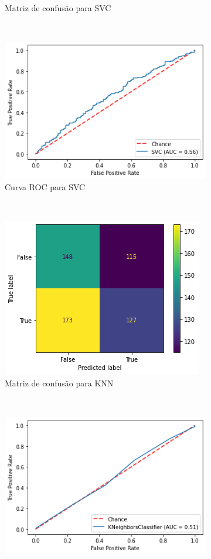 \begin{figure}[htb]
\begin{subfigure}[b]{0.45\textwidth}
        \caption{Matriz de confusão para SVC}
        \label{fig:resultados:base-de-dados-28.3.3-confusion-matrix-svc-total-cnae}
    \end{subfigure} ~ \quad
    \begin{subfigure}[b]{0.45\textwidth}
        \includegraphics[scale=0.45]{images/base-de-dados-28.4.4-roc-curve-svc-total-cnae.png}
        \caption{Curva ROC para SVC}
        \label{fig:resultados:base-de-dados-28.3.4-roc-curve-svc-total-cnae}
    \end{subfigure} ~ \\
    \centering
    \begin{subfigure}[b]{0.45\textwidth}
        \includegraphics[scale=0.45]{images/base-de-dados-28.4.5-confusion-matrix-knn-total-cnae.png}
        \caption{Matriz de confusão para KNN}
        \label{fig:resultados:base-de-dados-28.3.5-confusion-matrix-knn-total-cnae}
    \end{subfigure} ~ \quad
    \begin{subfigure}[b]{0.45\textwidth}
        \includegraphics[scale=0.45]{images/base-de-dados-28.4.6-roc-curve-knn-total-cnae.png}

\end{subfigure}
\end{figure}
